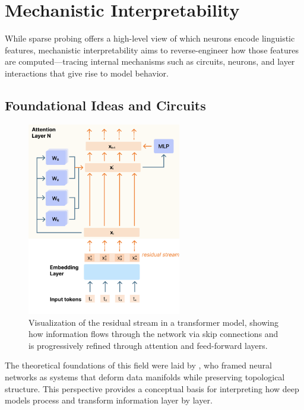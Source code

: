 \section{Mechanistic Interpretability}

While sparse probing offers a high-level view of which neurons encode linguistic features, mechanistic interpretability aims to reverse-engineer how those features are computed—tracing internal mechanisms such as circuits, neurons, and layer interactions that give rise to model behavior.

\subsection{Foundational Ideas and Circuits}

\begin{figure}[ht!]
    \centering
    \includegraphics[width=0.6\textwidth]{chapters/analysis_background/figures/residual_stream_visualization.pdf}
    \caption{Visualization of the residual stream in a transformer model, showing how information flows through the network via skip connections and is progressively refined through attention and feed-forward layers.}
    \label{fig:residual-stream}
\end{figure}


The theoretical foundations of this field were laid by \citet{olah2014manifolds}, who framed neural networks as systems that deform data manifolds while preserving topological structure. This perspective provides a conceptual basis for interpreting how deep models process and transform information layer by layer.

